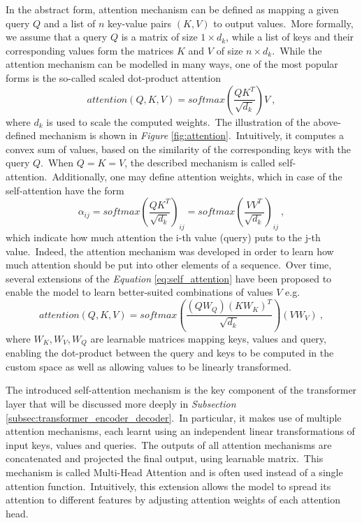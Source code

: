 \documentclass[longabstract, english, mgr]{iithesis}
\theoremstyle{default_theorem_style}\newtheorem{theorem}{Theorem}
\theoremstyle{default_theorem_style}\newtheorem{definition}{Definition}
\begin{document}
In the abstract form, attention mechanism can be defined as mapping a given query $Q$ and a list of $n$ key-value pairs
$(K, V)$ to output values.\ More formally, we assume that a query $Q$ is a matrix of size $1 \times d_k$, while
a list of keys and their corresponding values form the matrices $K$ and $V$ of size $n \times d_k$.\ While
the attention mechanism can be modelled in many ways, one of the most popular forms is the so-called scaled
dot-product attention
\begin{equation}\label{eq:self_attention}
attention(Q, K, V) = softmax\left( \frac{Q K^T}{\sqrt{d_k}} \right) V\ ,
\end{equation}
where $d_k$ is used to scale the computed weights.\ The illustration of the above-defined mechanism is shown in
\textit{Figure} \ref{fig:attention}.\ Intuitively, it computes a convex sum of values, based on the similarity of
the corresponding keys with the query $Q$.\ When $Q = K = V$, the described mechanism is called
self-attention.\ Additionally, one may define attention weights, which in case of the self-attention have the form
$$
\alpha_{ij} = softmax\left( \frac{Q K^T}{\sqrt{d_k}} \right)_{ij} =
softmax\left( \frac{V V^T}{\sqrt{d_k}} \right)_{ij}\ ,
$$
which indicate how much attention the i-th value (query) puts to the j-th value.\ Indeed, the attention mechanism
was developed in order to learn how much attention should be put into other elements of a sequence.\ Over
time, several extensions of the \textit{Equation} \ref{eq:self_attention} have been proposed to enable the model to
learn better-suited combinations of values $V$ e.g.\
$$
attention(Q, K, V) = softmax\left( \frac{(Q W_Q) (K W_K)^T}{\sqrt{d_k}} \right) (V W_V)\ ,
$$
where $W_K, W_V, W_Q$ are learnable matrices mapping keys, values and query, enabling the dot-product between the
query and keys to be computed in the custom space as well as allowing values to be linearly transformed.\newline

\noindent The introduced self-attention mechanism is the key component of the transformer layer that will be discussed
more deeply in \textit{Subsection} \ref{subsec:transformer_encoder_decoder}.\ In particular, it makes use of
multiple attention mechanisms, each learnt using an independent linear transformations
of input keys, values and queries.\ The outputs of all attention mechanisms are concatenated and projected the
final output, using learnable matrix.\ This mechanism is called Multi-Head Attention and is often used instead
of a single attention function.\ Intuitively, this extension allows the model to spread its
attention to different features by adjusting attention weights of each attention head.
\end{document}
